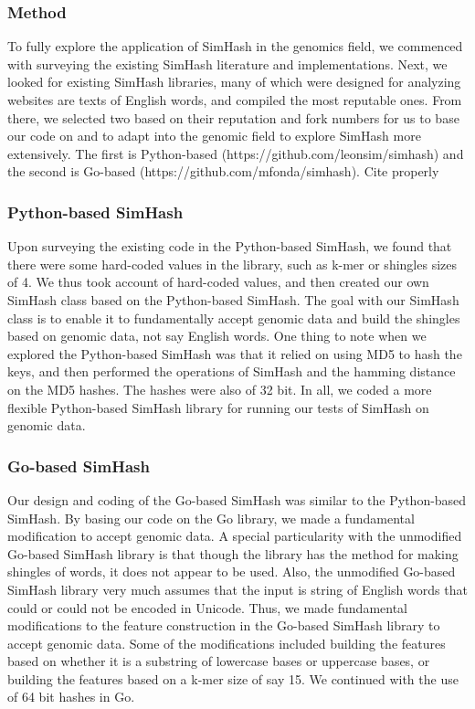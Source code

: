 \documentclass[12pt, letterpaper]{article}
\begin{document}
\subsubsection{Method}
To fully explore the application of SimHash in the genomics field, we commenced with surveying the existing SimHash literature and implementations. Next, we looked for existing SimHash libraries, many of which were designed for analyzing websites are texts of English words, and compiled the most reputable ones. From there, we selected two based on their reputation and fork numbers for us to base our code on and to adapt into the genomic field to explore SimHash more extensively. The first is Python-based (https://github.com/leonsim/simhash) and the second is Go-based (https://github.com/mfonda/simhash). \color{red} Cite properly \color{black}

\subsubsection{Python-based SimHash}
Upon surveying the existing code in the Python-based SimHash, we found that there were some hard-coded values in the library, such as k-mer or shingles sizes of 4. We thus took account of hard-coded values, and then created our own SimHash class based on the Python-based SimHash. The goal with our SimHash class is to enable it to fundamentally accept genomic data and build the shingles based on genomic data, not say English words. One thing to note when we explored the Python-based SimHash was that it relied on using MD5 to hash the keys, and then performed the operations of SimHash and the hamming distance on the MD5 hashes. The hashes were also of 32 bit. In all, we coded a more flexible Python-based SimHash library for running our tests of SimHash on genomic data.

\subsubsection{Go-based SimHash}
Our design and coding of the Go-based SimHash was similar to the Python-based SimHash. By basing our code on the Go library, we made a fundamental modification to accept genomic data. A special particularity with the unmodified Go-based SimHash library is that though the library has the method for making shingles of words, it does not appear to be used. Also, the unmodified Go-based SimHash library very much assumes that the input is string of English words that could or could not be encoded in Unicode. Thus, we made fundamental modifications to the feature construction in the Go-based SimHash library to accept genomic data. Some of the modifications included building the features based on whether it is a substring of lowercase bases or uppercase bases, or building the features based on a k-mer size of say 15. We continued with the use of 64 bit hashes in Go.
\end{document}
